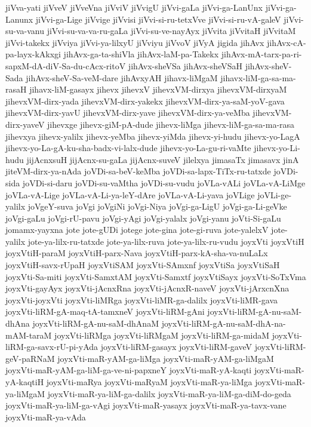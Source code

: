 {jiVva-yati
jiVveV
jiVveVna
jiVviV
jiVvigU
jiVvi-gaLa
jiVvi-ga-LanUnx
jiVvi-ga-Lanunx
jiVvi-ga-Lige
jiVvige
jiVvisi
jiVvi-si-ru-tetxVve
jiVvi-si-ru-vA-galeV
jiVvi-su-va-vanu
jiVvi-su-va-va-ru-gaLa
jiVvi-su-ve-nayAyx
jiVvita
jiVvitaH
jiVvitaM
jiVvi-takekx
jiVviya
jiVvi-ya-lilxyU
jiVviyu
jiVvoV
jiVyA
jigida
jihAvx
jihAvx-cA-pa-layx-kAkxgi
jihAvx-ga-ta-shiVla
jihAvx-laM-pa-Takekx
jihAvx-mA-tarx-pa-ri-sapxM-dA-diV-Sa-du-cAcx-ritoV
jihAvx-sheVSa
jihAvx-sheVSaH
jihAvx-sheV-Sada
jihAvx-sheV-Sa-veM-dare
jihAvxyAH
jihavx-liMgaM
jihavx-liM-ga-sa-ma-rasaH
jihavx-liM-gasayx
jihevx
jihevxV
jihevxVM-dirxya
jihevxVM-dirxyaM
jihevxVM-dirx-yada
jihevxVM-dirx-yakekx
jihevxVM-dirx-ya-saM-yoV-gava
jihevxVM-dirx-yavU
jihevxVM-dirx-yave
jihevxVM-dirx-ya-veMba
jihevxVM-dirx-yaveV
jihevxge
jihevx-giM-pA-dude
jihevx-liMga
jihevx-liM-ga-sa-ma-rasa
jihevxya
jihevx-yalilx
jihevx-yeMba
jihevx-yiMda
jihevx-yi-hudu
jihevx-yo-LagA
jihevx-yo-La-gA-ku-sha-badx-vi-lalx-dude
jihevx-yo-La-gu-ri-vaMte
jihevx-yo-Li-hudu
jijAcnxsuH
jijAcnx-su-gaLa
jijAcnx-suveV
jilelxya
jimasaTx
jimasavx
jinA
jiteVM-dirx-ya-nAda
joVDi-sa-beV-keMba
joVDi-sa-lapx-TiTx-ru-tatxde
joVDi-sida
joVDi-si-daru
joVDi-su-vaMtha
joVDi-su-vudu
joVLa-vALi
joVLa-vA-LiMge
joVLa-vA-Lige
joVLa-vA-Li-ya-leY-dAre
joVLa-vA-Li-yava
joVLige
joVLi-ge-yalilx
joVgeY-suva
joVgi
joVgiNi
joVgi-Niya
joVgi-ga-LigU
joVgi-ga-Li-geVke
joVgi-gaLu
joVgi-rU-pavu
joVgi-yAgi
joVgi-yalalx
joVgi-yanu
joVti-Si-gaLu
jomamx-yayxna
jote
jote-gUDi
jotege
jote-gina
jote-gi-ruva
jote-yalelxV
jote-yalilx
jote-ya-lilx-ru-tatxde
jote-ya-lilx-ruva
jote-ya-lilx-ru-vudu
joyxVti
joyxVtiH
joyxVtiH-paraM
joyxVtiH-parx-Nava
joyxVtiH-parx-kA-sha-va-nuLaLx
joyxVtiH-savx-rUpaH
joyxVtiSAM
joyxVti-SAmxnf
joyxVtiSa
joyxVtiSaH
joyxVti-Sa-miti
joyxVti-SamxtAM
joyxVti-Samxtf
joyxVtiSayx
joyxVti-SoTxVma
joyxVti-gayAyx
joyxVti-jAcnxRna
joyxVti-jAcnxR-naveV
joyxVti-jArxcnXna
joyxVti-joyxVti
joyxVti-liMRga
joyxVti-liMR-ga-dalilx
joyxVti-liMR-gava
joyxVti-liRM-gA-maq-tA-tamxneV
joyxVti-liRM-gAni
joyxVti-liRM-gA-nu-saM-dhAna
joyxVti-liRM-gA-nu-saM-dhAnaM
joyxVti-liRM-gA-nu-saM-dhA-na-mAM-taraM
joyxVti-liRMga
joyxVti-liRMgaM
joyxVti-liRM-ga-midaM
joyxVti-liRM-ga-savx-rU-pi-yAda
joyxVti-liRM-gasayx
joyxVti-liRM-gaveV
joyxVti-liRM-geV-paRNaM
joyxVti-maR-yAM-ga-liMga
joyxVti-maR-yAM-ga-liMgaM
joyxVti-maR-yAM-ga-liM-ga-ve-ni-papxneY
joyxVti-maR-yA-kaqti
joyxVti-maR-yA-kaqtiH
joyxVti-maRya
joyxVti-maRyaM
joyxVti-maR-ya-liMga
joyxVti-maR-ya-liMgaM
joyxVti-maR-ya-liM-ga-dalilx
joyxVti-maR-ya-liM-ga-diM-do-geda
joyxVti-maR-ya-liM-ga-vAgi
joyxVti-maR-yasayx
joyxVti-maR-ya-tavx-vane
joyxVti-maR-ya-vAda
}
